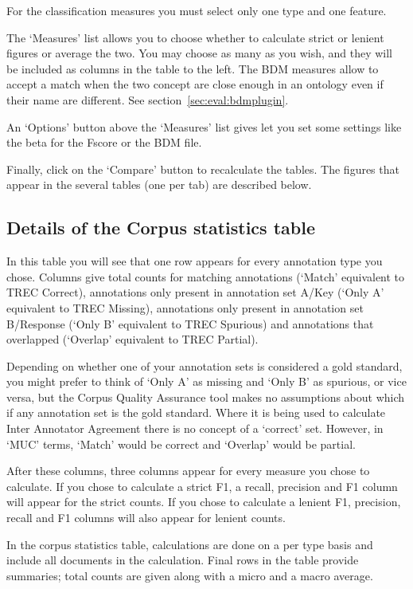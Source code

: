 For the classification measures you must select only one type and one feature.

The `Measures' list allows you to choose whether to calculate strict or lenient
figures or average the two. You may choose as many as you wish, and they will
be included as columns in the table to the left. The BDM measures allow to
accept a match when the two concept are close enough in an ontology even if
their name are different. See section~\ref{sec:eval:bdmplugin}.

An `Options' button above the `Measures' list gives let you set some
settings like the beta for the Fscore or the BDM file.

Finally, click on the `Compare' button to recalculate the tables. The figures
that appear in the several tables (one per tab) are described below.

\subsection{Details of the Corpus statistics table}

In this table you will see that one row appears for every annotation type
you chose. Columns give total counts for matching annotations (`Match'
equivalent to TREC Correct), annotations only present in annotation set
A/Key (`Only A' equivalent to TREC Missing), annotations only present in
annotation set B/Response (`Only B' equivalent to TREC Spurious) and
annotations that overlapped (`Overlap' equivalent to TREC Partial).

Depending on whether one of your annotation sets is considered a
gold standard, you might prefer to think of `Only A' as missing and `Only B' as
spurious, or vice versa, but the Corpus Quality Assurance tool makes no
assumptions about which if any annotation set is the gold standard. Where it is
being used to calculate Inter Annotator Agreement there is no concept of a
`correct' set. However, in `MUC' terms, `Match' would be correct and `Overlap'
would be partial.

After these columns, three columns appear for every measure
you chose to calculate. If you chose to calculate a strict F1, a recall,
precision and F1 column will appear for the strict counts. If you chose to
calculate a lenient F1, precision, recall and F1 columns will also appear for
lenient counts.

In the corpus statistics table, calculations are done on a per type
basis and include all documents in the calculation. Final rows in the table
provide summaries; total counts are given along with a micro and a macro average.

